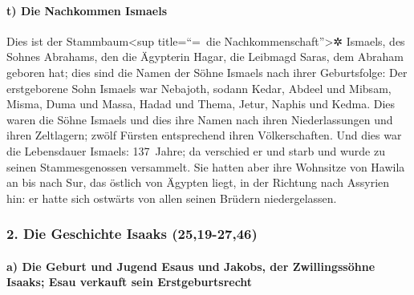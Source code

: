 \hypertarget{t-die-nachkommen-ismaels}{%
\paragraph{t) Die Nachkommen Ismaels}\label{t-die-nachkommen-ismaels}}

 Dies ist der Stammbaum\textless sup title=``=~die
Nachkommenschaft''\textgreater✲ Ismaels, des Sohnes Abrahams, den die
Ägypterin Hagar, die Leibmagd Saras, dem Abraham geboren hat;
 dies sind die Namen der Söhne Ismaels nach ihrer
Geburtsfolge: Der erstgeborene Sohn Ismaels war Nebajoth, sodann Kedar,
Abdeel und Mibsam,  Misma, Duma und Massa,
 Hadad und Thema, Jetur, Naphis und Kedma.
 Dies waren die Söhne Ismaels und dies ihre Namen nach
ihren Niederlassungen und ihren Zeltlagern; zwölf Fürsten entsprechend
ihren Völkerschaften.  Und dies war die Lebensdauer
Ismaels: 137~Jahre; da verschied er und starb und wurde zu seinen
Stammesgenossen versammelt.  Sie hatten aber ihre
Wohnsitze von Hawila an bis nach Sur, das östlich von Ägypten liegt, in
der Richtung nach Assyrien hin: er hatte sich ostwärts von allen seinen
Brüdern niedergelassen.

\hypertarget{die-geschichte-isaaks-2519-2746}{%
\subsubsection{2. Die Geschichte Isaaks
(25,19-27,46)}\label{die-geschichte-isaaks-2519-2746}}

\hypertarget{a-die-geburt-und-jugend-esaus-und-jakobs-der-zwillingssuxf6hne-isaaks-esau-verkauft-sein-erstgeburtsrecht}{%
\paragraph{a) Die Geburt und Jugend Esaus und Jakobs, der Zwillingssöhne
Isaaks; Esau verkauft sein
Erstgeburtsrecht}\label{a-die-geburt-und-jugend-esaus-und-jakobs-der-zwillingssuxf6hne-isaaks-esau-verkauft-sein-erstgeburtsrecht}}

